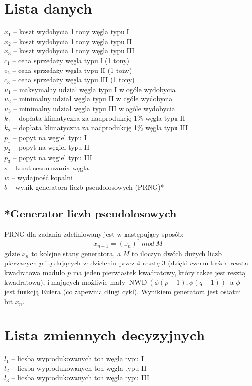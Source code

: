 \documentclass[titlepage]{article}
\begin{document}
\section{Lista danych}
$x_1$ -- koszt wydobycia 1 tony węgla typu I \\
$x_2$ -- koszt wydobycia 1 tony węgla typu II \\
$x_3$ -- koszt wydobycia 1 tony węgla typu III \\
$c_1$ -- cena sprzedaży węgla typu I (1 tony) \\
$c_2$ -- cena sprzedaży węgla typu II (1 tony) \\
$c_3$ -- cena sprzedaży węgla typu III (1 tony) \\
$u_1$ -- maksymalny udział węgla typu I w ogóle wydobycia \\
$u_2$ -- minimalny udział węgla typu II w ogóle wydobycia \\
$u_3$ -- minimalny udział węgla typu III w ogóle wydobycia \\
$k_1$ -- dopłata klimatyczna za nadprodukcję 1\% węgla typu II \\
$k_2$ -- dopłata klimatyczna za nadprodukcję 1\% węgla typu III \\
$p_1$ -- popyt na węgiel typu I \\
$p_2$ -- popyt na węgiel typu II \\
$p_3$ -- popyt na węgiel typu III \\
$s$ -- koszt sezonowania węgla \\
$w$ -- wydajność kopalni \\
$b$ -- wynik generatora liczb pseudolosowych (PRNG)* \\

\subsection{*Generator liczb pseudolosowych}
PRNG dla zadania zdefiniowany jest w następujący sposób:
$$x_{n + 1} = (x_n)^2 \ mod \ M$$
gdzie $x_n$ to kolejne stany generatora, a $M$ to iloczyn dwóch dużych liczb pierwszych $p$ i $q$ dających w dzieleniu przez 4 resztę 3 (dzięki czemu każda reszta kwadratowa modulo $p$ ma jeden pierwiastek kwadratowy,
który także jest resztą kwadratową), i mających możliwie mały $\operatorname{NWD}(\phi(p - 1), \phi(q - 1))$, a $\phi$ jest funkcją Eulera (co zapewnia długi cykl). Wynikiem generatora jest ostatni bit $x_n$.

\section{Lista zmiennych decyzyjnych}
$l_1$ -- liczba wyprodukowanych ton węgla typu I \\
$l_2$ -- liczba wyprodukowanych ton węgla typu II \\
$l_3$ -- liczba wyprodukowanych ton węgla typu III
\end{document}
